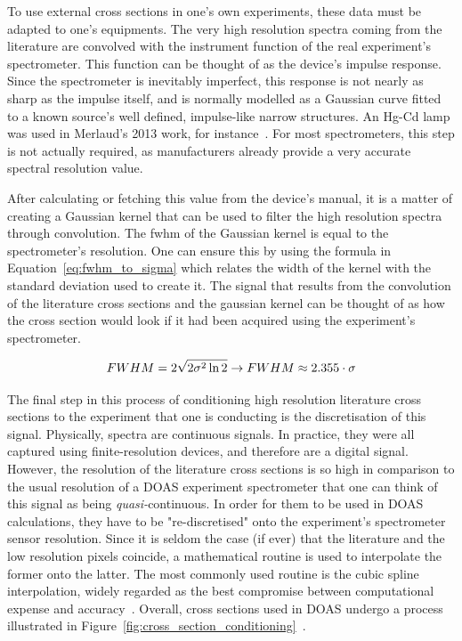 To use external cross sections in one's own experiments, these data must
be adapted to one's equipments. The very high resolution spectra coming
from the literature are convolved with the instrument function of the
real experiment's spectrometer. This function can be thought of as the
device's impulse response. Since the spectrometer is inevitably
imperfect, this response is not nearly as sharp as the impulse itself,
and is normally modelled as a Gaussian curve fitted to a known source's
well defined, impulse-like narrow structures. An Hg-Cd lamp was used in
Merlaud's 2013 work, for instance~\cite{Merlaud2013}.  For most
spectrometers, this step is not actually required, as manufacturers
already provide a very accurate spectral resolution value.

After calculating or fetching this value from the device's manual, it is
a matter of creating a Gaussian kernel that can be used to filter the
high resolution spectra through convolution. The \gls{fwhm} of the
Gaussian kernel is equal to the spectrometer's resolution. One can
ensure this by using the formula in Equation~\ref{eq:fwhm_to_sigma}
which relates the width of the kernel with the standard deviation used
to create it. The signal that results from the convolution of the
literature cross sections and the gaussian kernel can be thought of as
how the cross section would look if it had been acquired using the
experiment's spectrometer.

\begin{equation}
    \centering
    FWHM = 2 \sqrt{ 2 \sigma^2 \ln 2 } \rightarrow FWHM \approx 2.355
    \cdot \sigma
    \label{eq:fwhm_to_sigma}
\end{equation}

The final step in this process of conditioning high resolution
literature cross sections to the experiment that one is conducting is
the discretisation of this signal. Physically, spectra are continuous
signals. In practice, they were all captured using finite-resolution
devices, and therefore are a digital signal. However, the resolution of
the literature cross sections is so high in comparison to the usual
resolution of a \gls{DOAS} experiment spectrometer that one can think of
this signal as being \emph{quasi-}continuous. In order for them to be
used in \gls{DOAS} calculations, they have to be "re-discretised" onto
the experiment's spectrometer sensor resolution. Since it is seldom the
case (if ever) that the literature and the low resolution pixels
coincide, a mathematical routine is used to interpolate the former onto
the latter. The most commonly used routine is the cubic spline
interpolation, widely regarded as the best compromise between
computational expense and accuracy~\cite{Beekman2010}. Overall,
cross sections used in \gls{DOAS} undergo a process illustrated in
Figure~\ref{fig:cross_section_conditioning}~\cite{Danckaert2015,
Beekman2010}.

